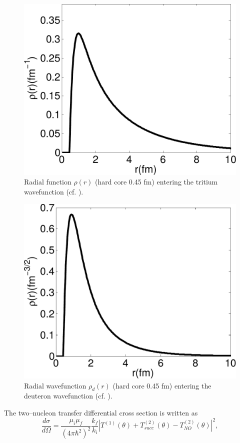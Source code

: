 \begin{figure}
\centerline{\includegraphics*[width=.55\textwidth,angle=0]{C7/figs_C7/tritium.pdf}}
\caption{Radial function $\rho(r)$ (hard core 0.45 fm) entering the tritium wavefunction (cf. \cite{Tang:65}).}\label{fig7_1_1}
\end{figure}
\begin{figure}
\centerline{\includegraphics*[width=.55\textwidth,angle=0]{C7/figs_C7/deuteron.pdf}}
\caption{Radial wavefunction $\rho_d(r)$ (hard core 0.45 fm) entering the deuteron wavefunction (cf. \cite{Tang:65}).}\label{fig7_1_2}
\end{figure}
The two--nucleon transfer differential cross section is written as
\begin{equation}\label{eq5.1.4}
\frac{d\sigma}{d\Omega}=\frac{\mu_i\mu_f}{(4\pi\hbar^2)^2}\frac{k_f}{k_i}\left|T^{(1)}(\theta)+T^{(2)}_{succ}(\theta)-T^{(2)}_{NO}(\theta)\right|^2,
\end{equation}


